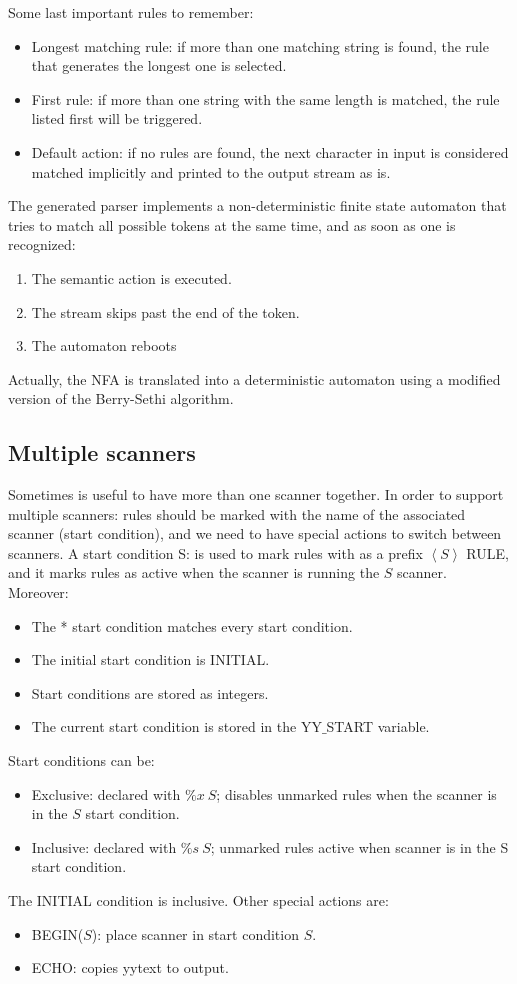 Some last important rules to remember:
\begin{itemize}
    \item Longest matching rule: if more than one matching string is found, the rule that generates the longest one is selected. 
    \item First rule: if more than one string with the same length is matched, the rule listed first will be triggered. 
    \item Default action: if no rules are found, the next character in input is considered matched implicitly and printed to the output stream as is.
\end{itemize}

The generated parser implements a non-deterministic finite state automaton that tries to match all possible tokens at the same time, and as soon as one is recognized:
\begin{enumerate}
    \item The semantic action is executed. 
    \item The stream skips past the end of the token. 
    \item The automaton reboots
\end{enumerate}
Actually, the NFA is translated into a deterministic automaton using a modified version of the Berry-Sethi algorithm. 

\subsection*{Multiple scanners}
Sometimes is useful to have more than one scanner together. In order to support multiple scanners: rules should be marked with the name of the associated scanner (start 
condition), and we need to have special actions to switch between scanners. A start condition S: is used to mark rules with as a prefix 
$\left\langle S \right\rangle$ RULE, and it marks rules as active when the scanner is running the $S$ scanner. Moreover:
\begin{itemize}
    \item The * start condition matches every start condition. 
    \item The initial start condition is INITIAL. 
    \item Start conditions are stored as integers.
    \item The current start condition is stored in the YY$\_$START variable.
\end{itemize}
Start conditions can be: 
\begin{itemize}
    \item Exclusive: declared with $\%x \: S$; disables unmarked rules when the scanner is in the $S$ start condition. 
    \item Inclusive: declared with $\%s \: S$; unmarked rules active when scanner is in the S start condition. 
\end{itemize}
The INITIAL condition is inclusive. Other special actions are: 
\begin{itemize}
    \item BEGIN($S$): place scanner in start condition $S$. 
    \item ECHO: copies yytext to output.
\end{itemize}